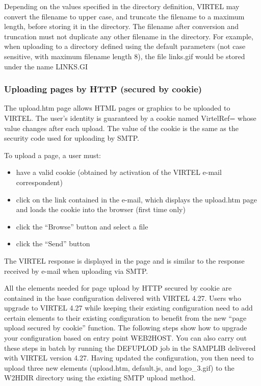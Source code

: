 \documentclass[letterpaper,10pt,english]{sphinxmanual}
\begin{document}
Depending on the values specified in the directory definition, VIRTEL may convert the filename to upper case, and
truncate the filename to a maximum length, before storing it in the directory. The filename after conversion and
truncation must not duplicate any other filename in the directory. For example, when uploading to a directory defined
using the default parameters (not case sensitive, with maximum filename length 8), the file links.gif would be stored
under the name LINKS.GI


\subsubsection{Uploading pages by HTTP (secured by cookie)}
\label{\detokenize{User_Guide:v457ug-http-uploading-pages}}\label{\detokenize{User_Guide:uploading-pages-by-http-secured-by-cookie}}
The upload.htm page allows HTML pages or graphics to be uploaded to VIRTEL. The user’s identity is guaranteed by a
cookie named VirtelRef= whose value changes after each upload. The value of the cookie is the same as the security
code used for uploading by SMTP.

To upload a page, a user must:
\begin{itemize}
\item {} 
have a valid cookie (obtained by activation of the VIRTEL e-mail correspondent)

\item {} 
click on the link contained in the e-mail, which displays the upload.htm page and loads the cookie into the browser (first time only)

\item {} 
click the “Browse” button and select a file

\item {} 
click the “Send” button

\end{itemize}

The VIRTEL response is displayed in the page and is similar to the response received by e-mail when uploading via
SMTP.


All the elements needed for page upload by HTTP secured by cookie are contained in the base configuration delivered
with VIRTEL 4.27. Users who upgrade to VIRTEL 4.27 while keeping their existing configuration need to add certain
elements to their existing configuration to benefit from the new “page upload secured by cookie” function.
The following steps show how to upgrade your configuration based on entry point WEB2HOST. You can also carry out
these steps in batch by running the DEFUPLOD job in the SAMPLIB delivered with VIRTEL version 4.27. Having updated
the configuration, you then need to upload three new elements (upload.htm, default.js, and logo\_3.gif) to the W2HDIR
directory using the existing SMTP upload method.
\end{document}
